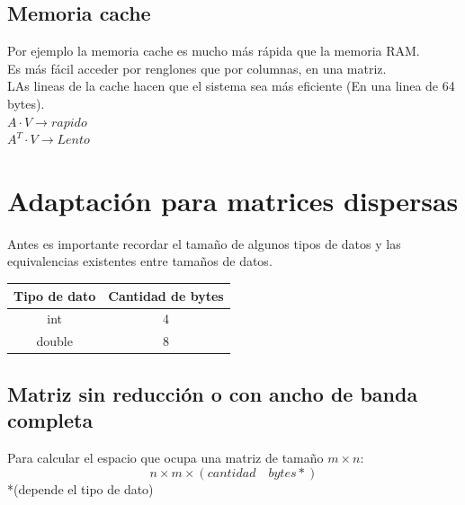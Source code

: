 \subsection{Memoria cache}
Por ejemplo la memoria cache es mucho m\'as r\'apida que la memoria RAM.\\
Es m\'as f\'acil acceder por renglones que por columnas, en una matriz.\\
LAs lineas de la cache hacen que el sistema sea más eficiente (En una linea de 64 bytes).\\
$A\cdot V \rightarrow rapido$\\
$A^T\cdot V\rightarrow Lento$

\section{Adaptaci\'on para matrices dispersas}
Antes es importante recordar el tamaño de algunos tipos de datos y las equivalencias existentes entre tamaños de datos. 
\begin{tabular}{| c | c |}
\hline
Tipo de dato & Cantidad de bytes \\
\hline
int & 4 \\
double & 8\\
\hline
\end{tabular}
\subsection{Matriz sin reducci\'on o con ancho de banda completa}
Para calcular el espacio que ocupa una matriz de tamaño $m \times n$:
\begin{displaymath}
n\times m\times (cantidad\quad bytes*)
\end{displaymath}
*(depende el tipo de dato) 
